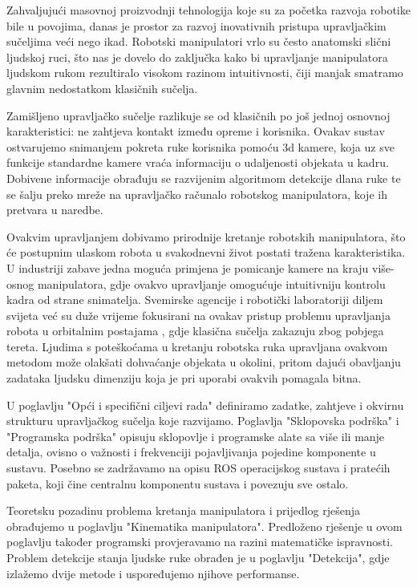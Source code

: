 \documentclass[times, utf8, diplomski, numeric]{fer}
\begin{document}
Zahvaljujući masovnoj proizvodnji tehnologija koje su za početka razvoja robotike bile u povojima, danas je prostor za razvoj inovativnih pristupa upravljačkim sučeljima veći nego ikad.
Robotski manipulatori vrlo su često anatomski slični ljudskoj ruci, što nas je dovelo do zaključka kako bi upravljanje manipulatora ljudskom rukom rezultiralo visokom razinom intuitivnosti, čiji manjak smatramo glavnim nedostatkom klasičnih sučelja.

Zamišljeno upravljačko sučelje razlikuje se od klasičnih po još jednoj osnovnoj karakteristici: ne zahtjeva kontakt između opreme i korisnika.
Ovakav sustav ostvarujemo snimanjem pokreta ruke korisnika pomoću 3d kamere, koja uz sve funkcije standardne kamere vraća informaciju o udaljenosti objekata u kadru.
Dobivene informacije obrađuju se razvijenim algoritmom detekcije dlana ruke te se šalju preko mreže na upravljačko računalo robotskog manipulatora, koje ih pretvara u naredbe.

Ovakvim upravljanjem dobivamo prirodnije kretanje robotskih manipulatora, što će postupnim ulaskom robota u svakodnevni život postati tražena karakteristika.
U industriji zabave jedna moguća primjena je pomicanje kamere na kraju više-osnog manipulatora, gdje ovakvo upravljanje omogućuje intuitivniju kontrolu kadra od strane snimatelja.
Svemirske agencije i robotički laboratoriji diljem svijeta već su duže vrijeme fokusirani na ovakav pristup problemu upravljanja robota u orbitalnim postajama \cite{yoshida2009achievements} \cite{larson1999human}, gdje klasična sučelja zakazuju zbog pobjega tereta.
Ljudima s poteškoćama u kretanju robotska ruka upravljana ovakvom metodom može olakšati dohvaćanje objekata u okolini, pritom dajući obavljanju zadataka ljudsku dimenziju koja je pri uporabi ovakvih pomagala bitna.

U poglavlju "Opći i specifični ciljevi rada" definiramo zadatke, zahtjeve i okvirnu strukturu upravljačkog sučelja koje razvijamo.
Poglavlja "Sklopovska podrška" i "Programska podrška" opisuju sklopovlje i programske alate sa više ili manje detalja, ovisno o važnosti i frekvenciji pojavljivanja pojedine komponente u sustavu.
Posebno se zadržavamo na opisu ROS operacijskog sustava i pratećih paketa, koji čine centralnu komponentu sustava i povezuju sve ostalo.

Teoretsku pozadinu problema kretanja manipulatora i prijedlog rješenja obrađujemo u poglavlju "Kinematika manipulatora".
Predloženo rješenje u ovom poglavlju također programski provjeravamo na razini matematičke ispravnosti.
Problem detekcije stanja ljudske ruke obrađen je u poglavlju "Detekcija", gdje izlažemo dvije metode i uspoređujemo njihove performanse.
\end{document}
